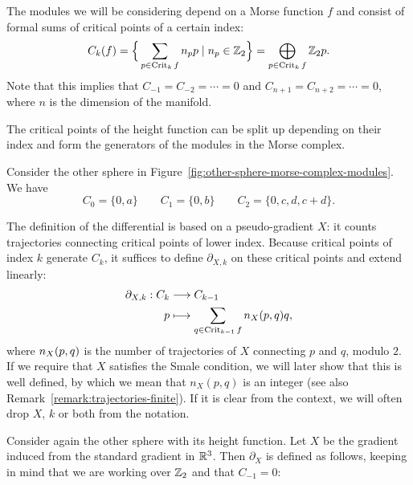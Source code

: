 The modules we will be considering depend on a Morse function $f$ and consist of formal sums of critical points of a certain index:
\[
    C_k(f) = \Big\{ \sum_{p \in \operatorname{Crit}_k f} n_p p  \mid n_p \in \mathbb{Z}_2\Big\}  = \bigoplus_{p \in \operatorname{Crit}_k f} \mathbb{Z}_2 p
.\] 
Note that this implies that $C_{-1} = C_{-2} = \cdots = 0$ and $C_{n+1} = C_{n+2} = \cdots = 0$, where $n$ is the dimension of the manifold.


\begin{marginfigure}
    \centering
    \caption{The critical points of the height function can be split up depending on their index and form the generators of the modules in the Morse complex.}
    \label{fig:other-sphere-morse-complex-modules}
\end{marginfigure}

\begin{eg}
    Consider the other sphere in Figure~\ref{fig:other-sphere-morse-complex-modules}. We have
    \[
    C_0 = \{0, a\}  \qquad C_1 = \{0, b\}  \qquad C_2 = \{0, c, d, c+d\} 
    .\] 
\end{eg}

The definition of the differential is based on a pseudo-gradient $X$: it counts trajectories connecting critical points of lower index.
Because critical points of index $k$ generate $C_k$, it suffices to define $\partial_{X,k}$ on these critical points and extend linearly:
\begin{align*}
    \partial_{X, k}: C_k &\longrightarrow C_{k-1} \\
    p &\longmapsto \sum_{q \in \operatorname{Crit}_{k-1} f} n_{X}(p, q) q
,\end{align*}
where $n_{X}(p, q)$ is the number of trajectories of $X$ connecting $p$ and $q$, modulo $2$.
If we require that $X$ satisfies the Smale condition, we will later show that this is well defined, by which we mean that $n_X(p,q)$ is an integer (see also Remark~\ref{remark:trajectories-finite}).
If it is clear from the context, we will often drop $X$, $k$ or both from the notation.
\begin{eg}
    Consider again the other sphere with its height function.
    Let $X$ be the gradient induced from the standard gradient in $\mathbb{R}^3$.
    Then $\partial_X$ is defined as follows, keeping in mind that we are working over $\mathbb{Z}_2$ and that $C_{-1} = 0$:
\begin{figure}[H]
    \centering
\end{figure}
\end{eg}

